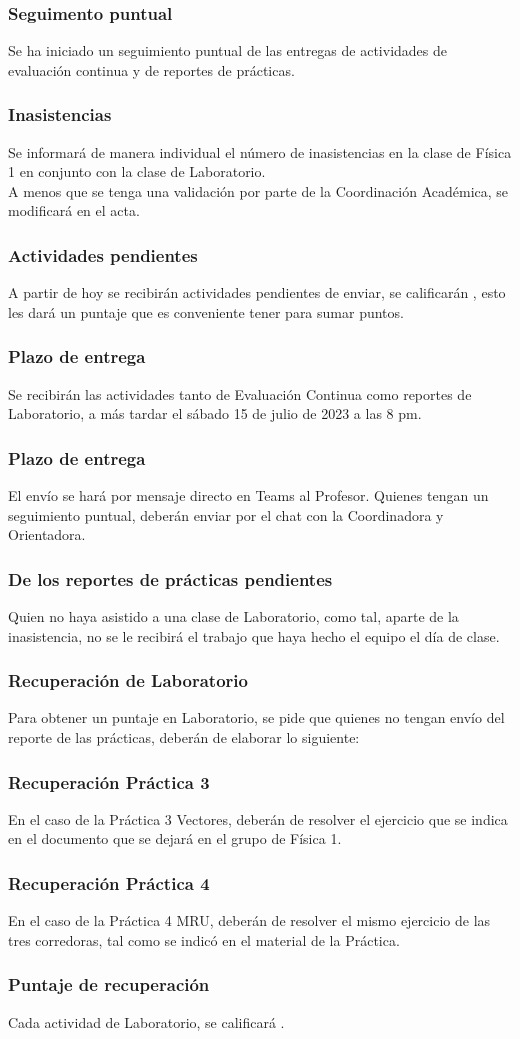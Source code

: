 \documentclass[14pt]{beamer}
\begin{document}
\begin{frame}
\frametitle{Seguimento puntual}
Se ha iniciado un seguimiento puntual de las entregas de actividades de evaluación continua y de reportes de prácticas.
\end{frame}
\begin{frame}
\frametitle{Inasistencias}
Se informará de manera individual el número de inasistencias en la clase de Física 1 en conjunto con la clase de Laboratorio.
\\
\bigskip
\pause
A menos que se tenga una validación por parte de la Coordinación Académica, se modificará en el acta.
\end{frame}
\begin{frame}
\frametitle{Actividades pendientes}
A partir de hoy se recibirán actividades pendientes de enviar, \pause se calificarán , esto les dará un puntaje que es conveniente tener para sumar puntos.
\end{frame}
\begin{frame}
\frametitle{Plazo de entrega}
Se recibirán las actividades tanto de Evaluación Continua como reportes de Laboratorio, a más tardar el sábado 15 de julio de 2023 a las 8 pm.
\end{frame}
\begin{frame}
\frametitle{Plazo de entrega}
El envío se hará por mensaje directo en Teams al Profesor. Quienes tengan un seguimiento puntual, deberán enviar por el chat con la Coordinadora y Orientadora.
\end{frame}
\begin{frame}
\frametitle{De los reportes de prácticas pendientes}
Quien no haya asistido a una clase de Laboratorio, como tal, aparte de la inasistencia, no se le recibirá el trabajo que haya hecho el equipo el día de clase.
\end{frame}
\begin{frame}
\frametitle{Recuperación de Laboratorio}
Para obtener un puntaje en Laboratorio, se pide que quienes no tengan envío del reporte de las prácticas, \pause deberán de elaborar lo siguiente:
\end{frame}
\begin{frame}
\frametitle{Recuperación Práctica 3}
En el caso de la Práctica 3 Vectores, \pause deberán de resolver el ejercicio que se indica en el documento que se dejará en el grupo de Física 1.
\end{frame}
\begin{frame}
\frametitle{Recuperación Práctica 4}
En el caso de la Práctica 4 MRU, \pause deberán de resolver el mismo ejercicio de las tres corredoras, tal como se indicó en el material de la Práctica.
\end{frame}
\begin{frame}
\frametitle{Puntaje de recuperación}
Cada actividad de Laboratorio, se calificará .
\end{frame}
\end{document}
